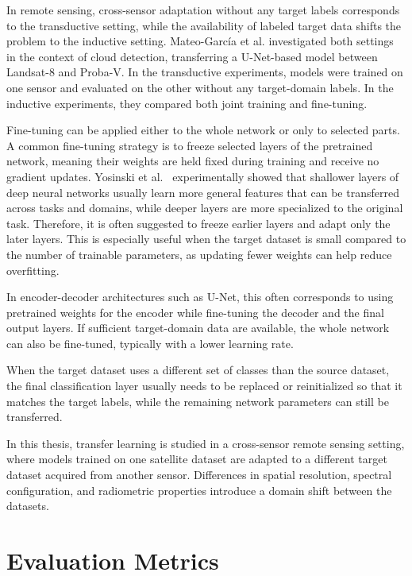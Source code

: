 In remote sensing, cross-sensor adaptation without any target labels corresponds to the transductive setting, while the availability of labeled target data shifts the problem to the inductive setting. Mateo-García et al. \cite{garcia2020} investigated both settings in the context of cloud detection, transferring a U-Net-based model between Landsat-8 and Proba-V. In the transductive experiments, models were trained on one sensor and evaluated on the other without any target-domain labels. In the inductive experiments, they compared both joint training and fine-tuning.

Fine-tuning can be applied either to the whole network or only to selected parts. A common fine-tuning strategy is to freeze selected layers of the pretrained network, meaning their weights are held fixed during training and receive no gradient updates. Yosinski et al.~\cite{yosinski2014} experimentally showed that shallower layers of deep neural networks usually learn more general features that can be transferred across tasks and domains, while deeper layers are more specialized to the original task. Therefore, it is often suggested to freeze earlier layers and adapt only the later layers. This is especially useful when the target dataset is small compared to the number of trainable parameters, as updating fewer weights can help reduce overfitting.

In encoder-decoder architectures such as U-Net, this often corresponds to using pretrained weights for the encoder while fine-tuning the decoder and the final output layers. If sufficient target-domain data are available, the whole network can also be fine-tuned, typically with a lower learning rate.

When the target dataset uses a different set of classes than the source dataset, the final classification layer usually needs to be replaced or reinitialized so that it matches the target labels, while the remaining network parameters can still be transferred.

In this thesis, transfer learning is studied in a cross-sensor remote sensing setting, where models trained on one satellite dataset are adapted to a different target dataset acquired from another sensor. Differences in spatial resolution, spectral configuration, and radiometric properties introduce a domain shift between the datasets.

\section{Evaluation Metrics}
\label{sec:evaluation_metrics}

